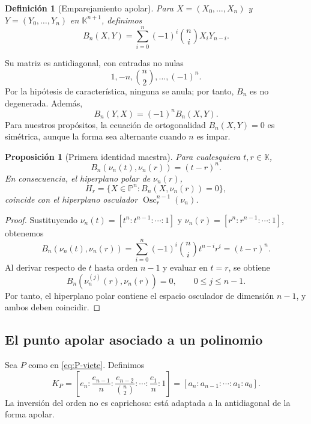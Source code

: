 \documentclass[11pt,oneside]{scrartcl}
\theoremstyle{plainblue}
\newtheorem{proposition}[theorem]{Proposición}
\theoremstyle{definitionblue}
\newtheorem{definition}[theorem]{Definición}
\theoremstyle{remarkgray}
\newcommand{\KK}{\mathbb{K}}
\newcommand{\PP}{\mathbb{P}}
\newcommand{\Osc}{\operatorname{Osc}}
\begin{document}
\begin{definition}[Emparejamiento apolar]\label{def:apolar-pairing}
Para \(X=(X_0,\dots,X_n)\) y \(Y=(Y_0,\dots,Y_n)\) en \(\KK^{n+1}\), definimos
\begin{equation}\label{eq:apolar}
B_n(X,Y)=\sum_{i=0}^{n}(-1)^i\binom ni X_iY_{n-i}.
\end{equation}
\end{definition}

Su matriz es antidiagonal, con entradas no nulas
\[
1,-n,\binom n2,\dots,(-1)^n.
\]
Por la hipótesis de característica, ninguna se anula; por tanto, \(B_n\) es no
degenerada. Además,
\[
B_n(Y,X)=(-1)^nB_n(X,Y).
\]
Para nuestros propósitos, la ecuación de ortogonalidad \(B_n(X,Y)=0\) es simétrica,
aunque la forma sea alternante cuando \(n\) es impar.

\begin{proposition}[Primera identidad maestra]\label{prop:first-master}
Para cualesquiera \(t,r\in\KK\),
\begin{equation}\label{eq:first-master}
B_n(\nu_n(t),\nu_n(r))=(t-r)^n.
\end{equation}
En consecuencia, el hiperplano polar de \(\nu_n(r)\),
\[
H_r=\{X\in\PP^n:B_n(X,\nu_n(r))=0\},
\]
coincide con el hiperplano osculador \(\Osc_r^{n-1}(\nu_n)\).
\end{proposition}

\begin{proof}
Sustituyendo \(\nu_n(t)=[t^n:t^{n-1}:\cdots:1]\) y
\(\nu_n(r)=[r^n:r^{n-1}:\cdots:1]\), obtenemos
\[
B_n(\nu_n(t),\nu_n(r))
=\sum_{i=0}^{n}(-1)^i\binom ni t^{n-i}r^i
=(t-r)^n.
\]
Al derivar respecto de \(t\) hasta orden \(n-1\) y evaluar en \(t=r\), se obtiene
\[
B_n(\nu_n^{(j)}(r),\nu_n(r))=0,
\qquad 0\le j\le n-1.
\]
Por tanto, el hiperplano polar contiene el espacio osculador de dimensión \(n-1\), y
ambos deben coincidir.
\end{proof}

\subsection{El punto apolar asociado a un polinomio}

Sea \(P\) como en \cref{eq:P-viete}. Definimos
\begin{equation}\label{eq:KP}
K_P=
\left[
 e_n:\frac{e_{n-1}}{n}:\frac{e_{n-2}}{\binom n2}:\cdots:
 \frac{e_1}{n}:1
\right]
=[a_n:a_{n-1}:\cdots:a_1:a_0].
\end{equation}
La inversión del orden no es caprichosa: está adaptada a la antidiagonal de la forma
apolar.
\end{document}
